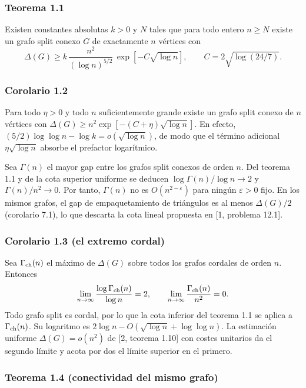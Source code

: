 \documentclass[spanish,11pt,a4paper]{article}
\begin{document}
\subsubsection{Teorema 1.1}\label{teorema-1.1}

Existen constantes absolutas \(k>0\) y \(N\) tales que para todo entero \(n\ge N\) existe un grafo split conexo \(G\) de exactamente \(n\) vértices con
\[\Delta(G)\ge k\,\frac{n^2}{(\log n)^{5/2}}\,\exp[-C\sqrt{\log n}],
\qquad C=2\sqrt{\log(24/7)}.\]

\subsubsection{Corolario 1.2}\label{corolario-1.2}

Para todo \(\eta>0\) y todo \(n\) suficientemente grande existe un grafo split conexo de \(n\) vértices con \(\Delta(G)\ge n^2\exp[-(C+\eta)\sqrt{\log n}]\). En efecto, \((5/2)\log\log n-\log k=o(\sqrt{\log n})\), de modo que el término adicional \(\eta\sqrt{\log n}\) absorbe el prefactor logarítmico.

Sea \(\Gamma(n)\) el mayor gap entre los grafos split conexos de orden \(n\). Del teorema 1.1 y de la cota superior uniforme se deducen \(\log\Gamma(n)/\log n\to2\) y \(\Gamma(n)/n^2\to0\). Por tanto, \(\Gamma(n)\) no es \(O(n^{2-\varepsilon})\) para ningún \(\varepsilon>0\) fijo. En los mismos grafos, el gap de empaquetamiento de triángulos es al menos \(\Delta(G)/2\) (corolario 7.1), lo que descarta la cota lineal propuesta en {[}1, problema 12.1{]}.

\subsubsection{Corolario 1.3 (el extremo cordal)}\label{corolario-1.3-el-extremo-cordal}

Sea \(\Gamma_{\rm ch}(n)\) el máximo de \(\Delta(G)\) sobre todos los grafos cordales de orden \(n\). Entonces \[\lim_{n\to\infty}\frac{\log\Gamma_{\rm ch}(n)}{\log n}=2,\qquad
\lim_{n\to\infty}\frac{\Gamma_{\rm ch}(n)}{n^2}=0.\] Todo grafo split es cordal, por lo que la cota inferior del teorema 1.1 se aplica a \(\Gamma_{\rm ch}(n)\). Su logaritmo es \(2\log n-O(\sqrt{\log n}+\log\log n)\). La estimación uniforme \(\Delta(G)=o(n^2)\) de {[}2, teorema 1.10{]} con costes unitarios da el segundo límite y acota por dos el límite superior en el primero.

\subsubsection{Teorema 1.4 (conectividad del mismo grafo)}\label{teorema-1.4-conectividad-del-mismo-grafo}
\end{document}
